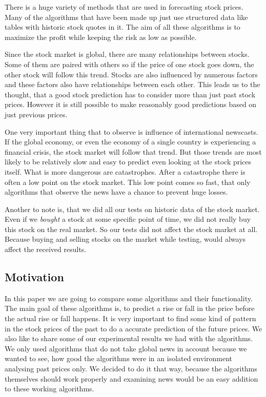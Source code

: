\documentclass[conference]{IEEEtran}
\begin{document}
There is a huge variety of methods that are used in forecasting stock prices. Many of the algorithms that have been made up just use structured data like tables with historic stock quotes in it. The aim of all these algorithms is to maximize the profit while keeping the risk as low as possible.

Since the stock market is global, there are many relationships between stocks. Some of them are paired with others so if the price of one stock goes down, the other stock will follow this trend.
Stocks are also influenced by numerous factors and these factors also have relationships between each other. This leads us to the thought, that a good stock prediction has to consider more than just past stock prices. However it is still possible to make reasonably good predictions based on just previous prices.

One very important thing that to observe is influence of international newscasts. If the global economy, or even the economy of a single country is experiencing a financial crisis, the stock market will follow that trend. But those trends are most likely to be relatively slow and easy to predict even looking at the stock prices itself. What is more dangerous are catastrophes. After a catastrophe there is often a low point on the stock market. This low point comes so fast, that only algorithms that observe the news have a chance to prevent huge losses.

Another to note is, that we did all our tests on historic data of the stock market. Even if we \textit{bought} a stock at some specific point of time, we did not really buy this stock on the real market. So our tests did not affect the stock market at all. Because buying and selling stocks on the market while testing, would always affect the received results.

\subsection{Motivation}

In this paper we are going to compare some algorithms and their functionality. The main goal of these algorithms is, to predict a rise or fall in the price before the actual rise or fall happens. It is very important to find some kind of pattern in the stock prices of the past to do a accurate prediction of the future prices. We also like to share some of our experimental results we had with the algorithms. We only used algorithms that do not take global news in account because we wanted to see, how good the algorithms were in an isolated environment analysing past prices only. We decided to do it that way, because the algorithms themselves should work properly and examining news would be an easy addition to these working algorithms.
\end{document}
